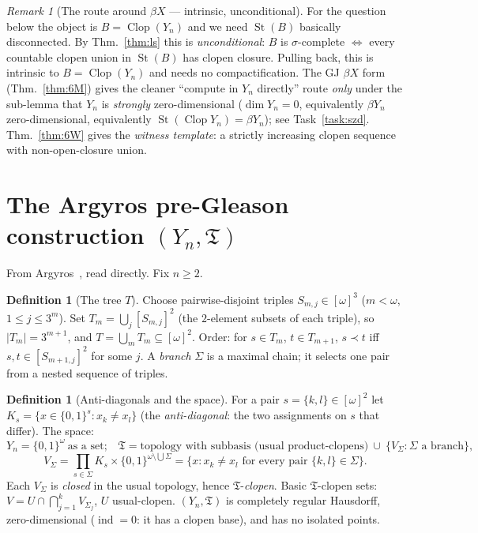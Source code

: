 \documentclass[11pt]{article}
\theoremstyle{definition}
\newtheorem{definition}[theorem]{Definition}
\theoremstyle{remark}
\newtheorem{remark}[theorem]{Remark}
\newcommand{\Clop}{\operatorname{Clop}}
\newcommand{\St}{\operatorname{St}}
\newcommand{\Y}{Y_n}
\newcommand{\T}{\mathfrak{T}}
\newcommand{\Ks}{K_s}
\begin{document}
\begin{remark}[The route around $\beta X$ --- intrinsic, unconditional]\label{rem:intrinsic}
For the question below the object is $B=\Clop(\Y)$ and we need $\St(B)$ basically
disconnected. By Thm.~\ref{thm:ls} this is \emph{unconditional}: $B$ is
$\sigma$-complete $\iff$ every countable clopen union in $\St(B)$ has clopen
closure. Pulling back, this is intrinsic to $B=\Clop(\Y)$ and needs no
compactification. The GJ $\beta X$ form (Thm.~\ref{thm:6M}) gives the cleaner
``compute in $\Y$ directly'' route \emph{only} under the sub-lemma that $\Y$ is
\emph{strongly} zero-dimensional ($\dim\Y=0$, equivalently $\beta\Y$
zero-dimensional, equivalently $\St(\Clop\Y)=\beta\Y$); see Task~\ref{task:szd}.
Thm.~\ref{thm:6W} gives the \emph{witness template}: a strictly increasing clopen
sequence with non-open-closure union.
\end{remark}

\section{The Argyros pre-Gleason construction $(\Y,\T)$}\label{sec:argyros}

From Argyros~\cite[\S1.0--1.3]{Argyros1983}, read directly. Fix $n\ge 2$.

\begin{definition}[The tree $T$]\label{def:tree}
Choose pairwise-disjoint triples $S_{m,j}\in[\omega]^3$ ($m<\omega$, $1\le j\le 3^m$).
Set $T_m=\bigcup_{j}[S_{m,j}]^2$ (the $2$-element subsets of each triple), so
$|T_m|=3^{m+1}$, and $T=\bigcup_m T_m\subseteq[\omega]^2$. Order: for $s\in T_m$,
$t\in T_{m+1}$, $s\prec t$ iff $s,t\in[S_{m+1,j}]^2$ for some $j$. A \emph{branch}
$\Sigma$ is a maximal chain; it selects one pair from a nested sequence of triples.
\end{definition}

\begin{definition}[Anti-diagonals and the space]\label{def:space}
For a pair $s=\{k,l\}\in[\omega]^2$ let $\Ks=\{x\in\{0,1\}^s : x_k\neq x_l\}$ (the
\emph{anti-diagonal}: the two assignments on $s$ that differ). The space:
\[
  \Y=\{0,1\}^{\omega}\ \text{as a set;}\quad
  \T = \text{topology with subbasis }
  \bigl(\text{usual product-clopens}\bigr)\ \cup\ \{V_\Sigma:\Sigma\text{ a branch}\},
\]
\[
  V_\Sigma = \prod_{s\in\Sigma}\Ks \times \{0,1\}^{\omega\setminus\bigcup\Sigma}
  = \{x : x_k\neq x_l \text{ for every pair } \{k,l\}\in\Sigma\}.
\]
Each $V_\Sigma$ is \emph{closed} in the usual topology, hence $\T$-\emph{clopen}.
Basic $\T$-clopen sets: $V = U\cap\bigcap_{j=1}^{k}V_{\Sigma_j}$, $U$ usual-clopen.
$(\Y,\T)$ is completely regular Hausdorff, zero-dimensional ($\operatorname{ind}=0$:
it has a clopen base), and has no isolated points.
\end{definition}
\end{document}
